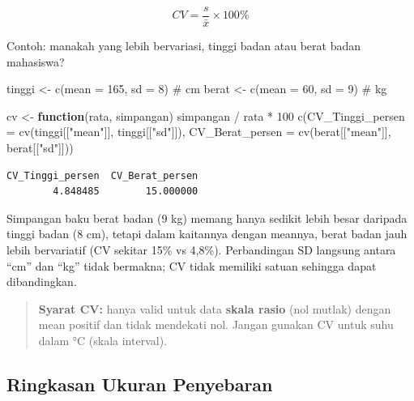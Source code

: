 \documentclass[
  indonesian,
  letterpaper,
]{book}
\newenvironment{Shaded}{\begin{snugshade}}{\end{snugshade}}
\newcommand{\AttributeTok}[1]{\textcolor[rgb]{0.40,0.45,0.13}{#1}}
\newcommand{\CommentTok}[1]{\textcolor[rgb]{0.37,0.37,0.37}{#1}}
\newcommand{\ControlFlowTok}[1]{\textcolor[rgb]{0.00,0.23,0.31}{\textbf{#1}}}
\newcommand{\DecValTok}[1]{\textcolor[rgb]{0.68,0.00,0.00}{#1}}
\newcommand{\FunctionTok}[1]{\textcolor[rgb]{0.28,0.35,0.67}{#1}}
\newcommand{\NormalTok}[1]{\textcolor[rgb]{0.00,0.23,0.31}{#1}}
\newcommand{\OtherTok}[1]{\textcolor[rgb]{0.00,0.23,0.31}{#1}}
\newcommand{\SpecialCharTok}[1]{\textcolor[rgb]{0.37,0.37,0.37}{#1}}
\newcommand{\StringTok}[1]{\textcolor[rgb]{0.13,0.47,0.30}{#1}}
\begin{document}
\[CV = \frac{s}{\bar{x}} \times 100\%\]

Contoh: manakah yang lebih bervariasi, tinggi badan atau berat badan
mahasiswa?

\begin{Shaded}
\begin{Highlighting}[]
\NormalTok{tinggi }\OtherTok{\textless{}{-}} \FunctionTok{c}\NormalTok{(}\AttributeTok{mean =} \DecValTok{165}\NormalTok{, }\AttributeTok{sd =} \DecValTok{8}\NormalTok{)   }\CommentTok{\# cm}
\NormalTok{berat  }\OtherTok{\textless{}{-}} \FunctionTok{c}\NormalTok{(}\AttributeTok{mean =} \DecValTok{60}\NormalTok{,  }\AttributeTok{sd =} \DecValTok{9}\NormalTok{)   }\CommentTok{\# kg}

\NormalTok{cv }\OtherTok{\textless{}{-}} \ControlFlowTok{function}\NormalTok{(rata, simpangan) simpangan }\SpecialCharTok{/}\NormalTok{ rata }\SpecialCharTok{*} \DecValTok{100}
\FunctionTok{c}\NormalTok{(}\AttributeTok{CV\_Tinggi\_persen =} \FunctionTok{cv}\NormalTok{(tinggi[[}\StringTok{"mean"}\NormalTok{]], tinggi[[}\StringTok{"sd"}\NormalTok{]]),}
\AttributeTok{CV\_Berat\_persen  =} \FunctionTok{cv}\NormalTok{(berat[[}\StringTok{"mean"}\NormalTok{]],  berat[[}\StringTok{"sd"}\NormalTok{]]))}
\end{Highlighting}
\end{Shaded}

\begin{verbatim}
CV_Tinggi_persen  CV_Berat_persen 
        4.848485        15.000000 
\end{verbatim}

Simpangan baku berat badan (9 kg) memang hanya sedikit lebih besar
daripada tinggi badan (8 cm), tetapi dalam kaitannya dengan meannya,
berat badan jauh lebih bervariatif (CV sekitar 15\% vs 4,8\%).
Perbandingan SD langsung antara ``cm'' dan ``kg'' tidak bermakna; CV
tidak memiliki satuan sehingga dapat dibandingkan.

\begin{quote}
\textbf{Syarat CV:} hanya valid untuk data \textbf{skala rasio} (nol
mutlak) dengan mean positif dan tidak mendekati nol. Jangan gunakan CV
untuk suhu dalam °C (skala interval).
\end{quote}

\subsection{Ringkasan Ukuran
Penyebaran}\label{ringkasan-ukuran-penyebaran}
\end{document}
